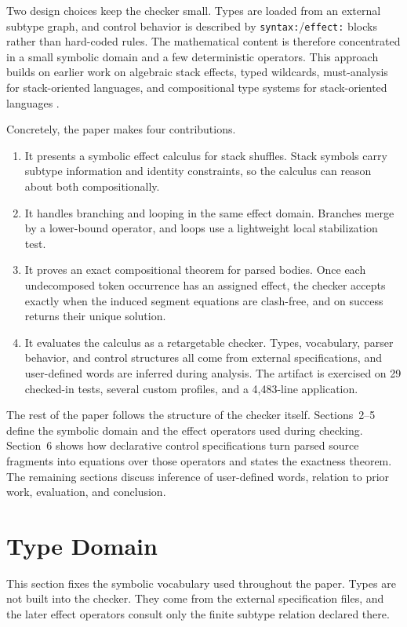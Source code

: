 \documentclass[acmsmall,screen,review,anonymous,nonacm]{acmart}
\begin{document}
Two design choices keep the checker small. Types are loaded from an external subtype
graph, and control behavior is described by \texttt{syntax:}/\texttt{effect:} blocks
rather than hard-coded rules. The mathematical content is therefore concentrated in a
small symbolic domain and a few deterministic operators. This approach builds on earlier
work on algebraic stack effects, typed wildcards, must-analysis for stack-oriented
languages, and compositional type systems for stack-oriented languages
\cite{poial1994algebraic,stoddart1993type,poial2002wildcards,saabas2006compositional,poial2006typing}.

Concretely, the paper makes four contributions.
\begin{enumerate}
\item It presents a symbolic effect calculus for stack shuffles. Stack symbols carry subtype information and identity constraints, so the calculus can reason about both compositionally.
\item It handles branching and looping in the same effect domain. Branches merge by a lower-bound operator, and loops use a lightweight local stabilization test.
\item It proves an exact compositional theorem for parsed bodies. Once each undecomposed token occurrence has an assigned effect, the checker accepts exactly when the induced segment equations are clash-free, and on success returns their unique solution.
\item It evaluates the calculus as a retargetable checker. Types, vocabulary, parser behavior, and control structures all come from external specifications, and user-defined words are inferred during analysis. The artifact is exercised on 29 checked-in tests, several custom profiles, and a 4{,}483-line application.
\end{enumerate}

The rest of the paper follows the structure of the checker itself. Sections~2--5 define
the symbolic domain and the effect operators used during checking. Section~6 shows how
declarative control specifications turn parsed source fragments into equations over those
operators and states the exactness theorem. The remaining sections discuss inference of
user-defined words, relation to prior work, evaluation, and conclusion.

\section{Type Domain}
\label{sec:type-domain}
This section fixes the symbolic vocabulary used throughout the paper. Types are not
built into the checker. They come from the external specification files, and the later
effect operators consult only the finite subtype relation declared there.
\end{document}
